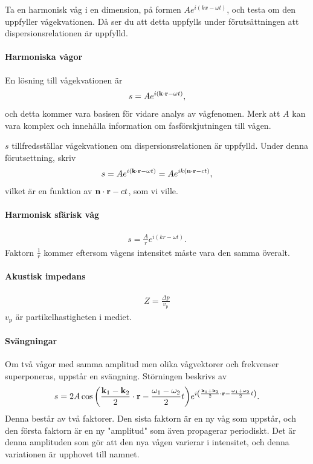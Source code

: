 \deriv
Ta en harmonisk våg i en dimension, på formen $Ae^{i(kx - \omega t)}$, och testa om den uppfyller vågekvationen. Då ser du att detta uppfylls under förutsättningen att dispersionsrelationen är uppfylld.

\paragraph{Harmoniska vågor}
En lösning till vågekvationen är
\begin{align*}
	s = Ae^{i(\vect{k}\cdot\vect{r} - \omega t)},
\end{align*}
och detta kommer vara basisen för vidare analys av vågfenomen. Merk att $A$ kan vara komplex och innehålla information om fasförskjutningen till vågen.

\deriv
$s$ tillfredsställar vågekvationen om dispersionsrelationen är uppfylld. Under denna förutsettning, skriv
\begin{align*}
	s = Ae^{i(\vect{k}\cdot\vect{r} - \omega t)} = Ae^{ik(\vect{n}\cdot\vect{r} - ct)},
\end{align*}
vilket är en funktion av $\vect{n}\cdot\vect{r} - ct$, som vi ville.

\paragraph{Harmonisk sfärisk våg}
\begin{align*}
	s = \frac{A}{r}e^{i(kr - \omega t)}.
\end{align*}
Faktorn $\frac{1}{r}$ kommer eftersom vågens intensitet måste vara den samma överalt.

\paragraph{Akustisk impedans}
\begin{align*}
	Z = \frac{\Delta p}{v_{\text{p}}}
\end{align*}
$v_{\text{p}}$ är partikelhastigheten i mediet.

\paragraph{Svängningar}
Om två vågor med samma amplitud men olika vågvektorer och frekvenser superponeras, uppstår en svängning. Störningen beskrivs av
\begin{align*}
	s = 2A\cos{\left(\frac{\vect{k}_{1} - \vect{k}_{2}}{2}\cdot\vect{r} - \frac{\omega_{1} - \omega_{2}}{2}t\right)}e^{i\left(\frac{\vect{k}_{1} + \vect{k}_{2}}{2}\cdot\vect{r} - \frac{\omega_{1} + \omega_{2}}{2}t\right)}.
\end{align*}
Denna består av två faktorer. Den sista faktorn är en ny våg som uppstår, och den första faktorn är en ny "amplitud" som även propagerar periodiskt. Det är denna amplituden som gör att den nya vågen varierar i intensitet, och denna variationen är upphovet till namnet.

